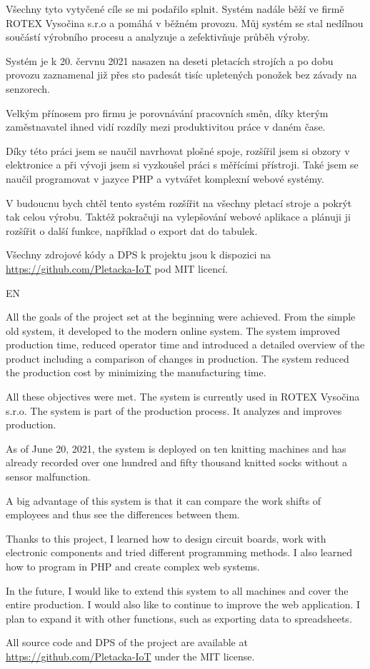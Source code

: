 \documentclass[12pt, a4paper]{article}
\begin{document}
Všechny tyto vytyčené cíle se mi podařilo splnit.
Systém nadále běží ve firmě ROTEX Vysočina s.r.o a pomáhá v běžném provozu.
Můj systém se stal nedílnou součástí výrobního procesu a analyzuje a zefektivňuje průběh výroby.

Systém je k 20. červnu 2021 nasazen na deseti pletacích strojích a po dobu provozu zaznamenal již přes sto padesát tisíc upletených ponožek bez závady na senzorech.

Velkým přínosem pro firmu je porovnávání pracovních směn, díky kterým zaměstnavatel ihned vidí rozdíly mezi produktivitou práce v daném čase.

Díky této práci jsem se naučil navrhovat plošné spoje, rozšířil jsem si obzory v elektronice a při vývoji jsem si vyzkoušel práci s měřícími přístroji.
Také jsem se naučil programovat v jazyce PHP a vytvářet komplexní webové systémy.

V budoucnu bych chtěl tento systém rozšířit na všechny pletací stroje a pokrýt tak celou výrobu.
Taktéž pokračuji na vylepšování webové aplikace a plánuji ji rozšířit o další funkce, například o export dat do tabulek.

Všechny zdrojové kódy a DPS k projektu jsou k dispozici na \url{https://github.com/Pletacka-IoT} pod MIT licencí.

EN

All the goals of the project set at the beginning were achieved. From the simple old system, it developed to the modern online system.
The system improved production time, reduced operator time and introduced a detailed overview of the product including a comparison of changes in production.
The system reduced the production cost by minimizing the manufacturing time.


All these objectives were met.
The system is currently used in ROTEX Vysočina s.r.o. The system is part of the production process. It analyzes and improves production.

As of June 20, 2021, the system is deployed on ten knitting machines and has already recorded over one hundred and fifty thousand knitted socks without a sensor malfunction.

A big advantage of this system is that it can compare the work shifts of employees and thus see the differences between them.

Thanks to this project, I learned how to design circuit boards, work with electronic components and tried different programming methods.
I also learned how to program in PHP and create complex web systems.

In the future, I would like to extend this system to all machines and cover the entire production.
I would also like to continue to improve the web application. I plan to expand it with other functions, such as exporting data to spreadsheets.

All source code and DPS of the project are available at \url{https://github.com/Pletacka-IoT} under the MIT license.


\newpage





\appendix
\end{document}
